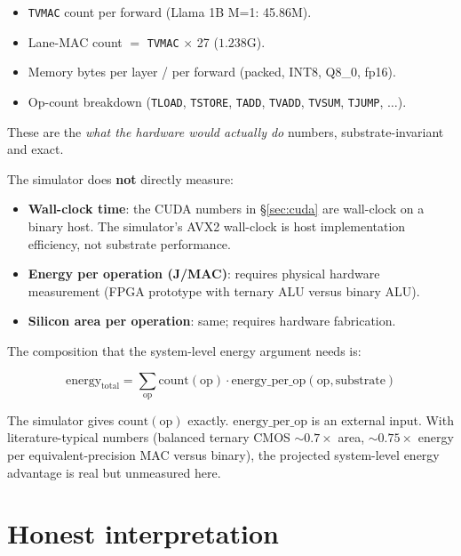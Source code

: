 \documentclass{article}
\begin{document}
\begin{itemize}
  \item \texttt{TVMAC} count per forward (Llama 1B M=1: 45.86M).
  \item Lane-{MAC} count $=$ \texttt{TVMAC} $\times$ 27 ($1.238$G).
  \item Memory bytes per layer / per forward (packed, {INT8}, Q8\_0,
    fp16).
  \item Op-count breakdown (\texttt{TLOAD}, \texttt{TSTORE}, \texttt{TADD},
    \texttt{TVADD}, \texttt{TVSUM}, \texttt{TJUMP}, $\ldots$).
\end{itemize}

These are the \emph{what the hardware would actually do} numbers,
substrate-invariant and exact.

The simulator does \textbf{not} directly measure:

\begin{itemize}
  \item \textbf{Wall-clock time}: the {CUDA} numbers in {\S}\ref{sec:cuda}
    are wall-clock on a binary host. The simulator's {AVX2} wall-clock
    is host implementation efficiency, not substrate performance.
  \item \textbf{Energy per operation (J/MAC)}: requires physical
    hardware measurement ({FPGA} prototype with ternary {ALU} versus
    binary {ALU}).
  \item \textbf{Silicon area per operation}: same; requires hardware
    fabrication.
\end{itemize}

The composition that the system-level energy argument needs is:

\begin{equation}
  \mathrm{energy}_\text{total} = \sum_\text{op} \mathrm{count}(\text{op}) \cdot \mathrm{energy\_per\_op}(\text{op}, \text{substrate})
\end{equation}

The simulator gives $\mathrm{count}(\text{op})$ exactly.
$\mathrm{energy\_per\_op}$ is an external input. With literature-typical
numbers \citep{ternary-cmos-survey, ternary-mac-energy} (balanced ternary
{CMOS} $\sim 0.7\times$ area, $\sim 0.75\times$ energy per
equivalent-precision {MAC} versus binary), the projected system-level
energy advantage is real but unmeasured here.

\section{Honest interpretation}
\end{document}
